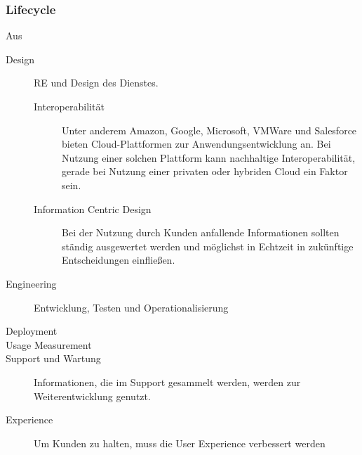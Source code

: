 \subsubsection{Lifecycle}
Aus 
\begin{description}
	\item[Design] RE und Design des Dienstes.
	\begin{description}
	\item[Interoperabilität] Unter anderem Amazon, Google, Microsoft,
VMWare und Salesforce bieten Cloud-Plattformen zur Anwendungsentwicklung an.
Bei Nutzung einer solchen Plattform kann nachhaltige Interoperabilität, gerade
bei Nutzung einer privaten oder hybriden Cloud ein Faktor sein.
	\item[Information Centric Design] Bei der Nutzung durch Kunden
anfallende Informationen sollten ständig ausgewertet werden und möglichst in
Echtzeit in zukünftige Entscheidungen einfließen.
\end{description}
	\item[Engineering] Entwicklung, Testen und Operationalisierung \\
	\item[Deployment]
	\item[Usage Measurement]
	\item[Support und Wartung] Informationen, die im Support gesammelt
werden, werden zur Weiterentwicklung genutzt.
	\item[Experience] Um Kunden zu halten, muss die User Experience
verbessert werden
\end{description}

